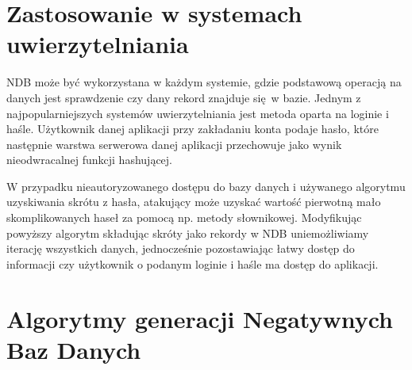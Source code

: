 \section{Zastosowanie w systemach uwierzytelniania}
NDB może być wykorzystana w każdym systemie, gdzie podstawową operacją na danych jest sprawdzenie czy
dany rekord znajduje się w bazie. Jednym z najpopularniejszych systemów uwierzytelniania jest metoda oparta na loginie i haśle.
Użytkownik danej aplikacji przy zakładaniu konta podaje hasło, które następnie warstwa serwerowa danej aplikacji przechowuje jako wynik nieodwracalnej funkcji hashującej.

W przypadku nieautoryzowanego dostępu do bazy danych i używanego algorytmu uzyskiwania skrótu z hasła, atakujący może uzyskać 
wartość pierwotną mało skomplikowanych haseł za pomocą np. metody słownikowej. Modyfikując powyższy algorytm 
składując skróty jako rekordy w NDB uniemożliwiamy iterację wszystkich danych, jednocześnie pozostawiając
łatwy dostęp do informacji czy użytkownik o podanym loginie i haśle ma dostęp do aplikacji.

\section{Algorytmy generacji Negatywnych Baz Danych}
